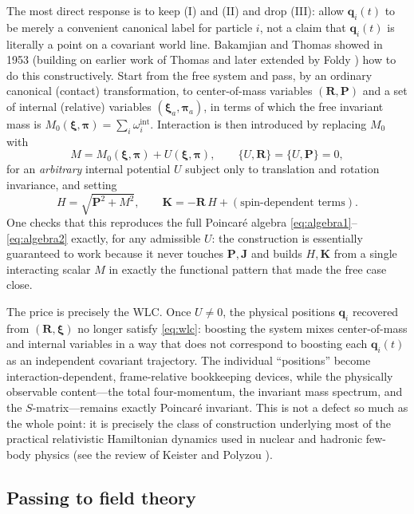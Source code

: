 \documentclass[11pt]{article}
\newcommand{\pb}[2]{\{#1,#2\}}
\newcommand{\bq}{\mathbf{q}}
\newcommand{\bK}{\mathbf{K}}
\newcommand{\bJ}{\mathbf{J}}
\newcommand{\bP}{\mathbf{P}}
\newcommand{\bR}{\mathbf{R}}
\begin{document}
The most direct response is to keep (I) and (II) and drop (III): allow $\bq_i(t)$ to be merely a convenient canonical label for particle $i$, not a claim that $\bq_i(t)$ is literally a point on a covariant world line. Bakamjian and Thomas showed in 1953 \cite{BakamjianThomas1953} (building on earlier work of Thomas \cite{Thomas1952} and later extended by Foldy \cite{Foldy1961}) how to do this constructively. Start from the free system and pass, by an ordinary canonical (contact) transformation, to center-of-mass variables $(\bR,\bP)$ and a set of internal (relative) variables $(\boldsymbol\xi_a,\boldsymbol\pi_a)$, in terms of which the free invariant mass is $M_0(\boldsymbol\xi,\boldsymbol\pi)=\sum_i\omega_i^{\text{int}}$. Interaction is then introduced by replacing $M_0$ with
\begin{equation}
M = M_0(\boldsymbol\xi,\boldsymbol\pi) + U(\boldsymbol\xi,\boldsymbol\pi), \qquad \pb{U}{\bR}=\pb{U}{\bP}=0,
\end{equation}
for an \emph{arbitrary} internal potential $U$ subject only to translation and rotation invariance, and setting
\begin{equation}
H=\sqrt{\bP^2+M^2}, \qquad \bK = -\bR\,H + (\text{spin-dependent terms}).
\end{equation}
One checks that this reproduces the full Poincar\'e algebra \eqref{eq:algebra1}--\eqref{eq:algebra2} exactly, for any admissible $U$: the construction is essentially guaranteed to work because it never touches $\bP,\bJ$ and builds $H,\bK$ from a single interacting scalar $M$ in exactly the functional pattern that made the free case close.

The price is precisely the WLC. Once $U\neq0$, the physical positions $\bq_i$ recovered from $(\bR,\boldsymbol\xi)$ no longer satisfy \eqref{eq:wlc}: boosting the system mixes center-of-mass and internal variables in a way that does not correspond to boosting each $\bq_i(t)$ as an independent covariant trajectory. The individual ``positions'' become interaction-dependent, frame-relative bookkeeping devices, while the physically observable content---the total four-momentum, the invariant mass spectrum, and the $S$-matrix---remains exactly Poincar\'e invariant. This is not a defect so much as the whole point: it is precisely the class of construction underlying most of the practical relativistic Hamiltonian dynamics used in nuclear and hadronic few-body physics (see the review of Keister and Polyzou \cite{KeisterPolyzou1991}).

\subsection{Passing to field theory}
\label{sec:field}
\end{document}
